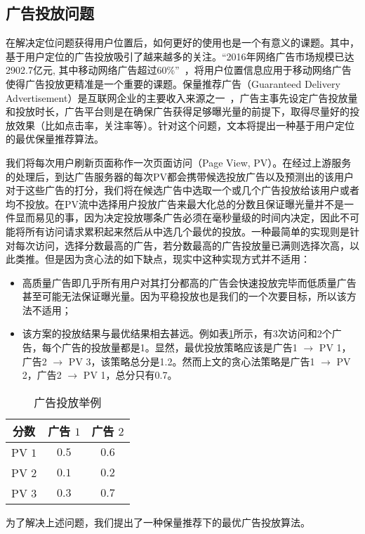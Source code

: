 \subsection{广告投放问题}

在解决定位问题获得用户位置后，如何更好的使用也是一个有意义的课题。其中，基于用户定位的广告投放吸引了越来越多的关注。“2016年网络广告市场规模已达2902.7亿元, 其中移动网络广告超过60\%”~\cite{赵杨2018基于机器学习混合算法的}，将用户位置信息应用于移动网络广告使得广告投放更精准是一个重要的课题。保量推荐广告（Guaranteed Delivery Advertisement）是互联网企业的主要收入来源之一~\cite{korula2016optimizing, mcafee2013maximally}，广告主事先设定广告投放量和投放时长，广告平台则是在确保广告获得足够曝光量的前提下，取得尽量好的投放效果（比如点击率，关注率等）。针对这个问题，文本将提出一种基于用户定位的最优保量推荐算法。

我们将每次用户刷新页面称作一次页面访问（Page  View, PV）。在经过上游服务的处理后，到达广告服务器的每次PV都会携带候选投放广告以及预测出的该用户对于这些广告的打分，我们将在候选广告中选取一个或几个广告投放给该用户或者均不投放。在PV流中选择用户投放广告来最大化总的分数且保证曝光量并不是一件显而易见的事，因为决定投放哪条广告必须在毫秒量级的时间内决定，因此不可能将所有访问请求累积起来然后从中选几个最优的投放。一种最简单的实现则是针对每次访问，选择分数最高的广告，若分数最高的广告投放量已满则选择次高，以此类推。但是因为贪心法的如下缺点，现实中这种实现方式并不适用：
\begin{itemize}
	\item 高质量广告即几乎所有用户对其打分都高的广告会快速投放完毕而低质量广告甚至可能无法保证曝光量。因为平稳投放也是我们的一个次要目标，所以该方法不适用；
	\item 该方案的投放结果与最优结果相去甚远。例如表\ref{tab:eoa}所示，有3次访问和2个广告，每个广告的投放量都是1。显然，最优投放策略应该是广告1 $\rightarrow$ PV 1，广告2 $\rightarrow$ PV 3，该策略总分是1.2。然而上文的贪心法策略是广告1 $\rightarrow$ PV 2，广告2 $\rightarrow$ PV 1，总分只有0.7。
\end{itemize}
\begin{table}[htb]
	\centering
	\caption{广告投放举例}
	\label{tab:eoa}
	\begin{tabular}{ccc}
		\toprule
		分数 & 广告 $1$ & 广告 $2$ \\
		\midrule
		PV $1$ & $0.5$ & $0.6$ \\
		\midrule
		PV $2$ & $0.1$ & $0.2$ \\
		\midrule
		PV $3$ & $0.3$ & $0.7$ \\
		\bottomrule
	\end{tabular}
\end{table}
为了解决上述问题，我们提出了一种保量推荐下的最优广告投放算法。

